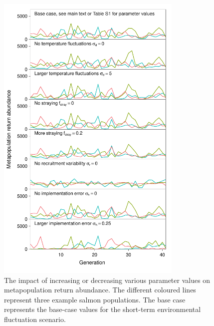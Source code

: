 \begin{figure}[htbp]
\centering
\includegraphics[width=3.5in]{metafolio/plot-various-options-ts-3pops}
\caption[The impact of increasing or decreasing various parameter values on
metapopulation return abundance.]{The impact of increasing or decreasing various parameter values on
metapopulation return abundance. The different coloured lines represent three
example salmon populations. The base case represents the base-case values for
the short-term environmental fluctuation scenario.}
\label{f:eg-sens}
\end{figure}

\clearpage


